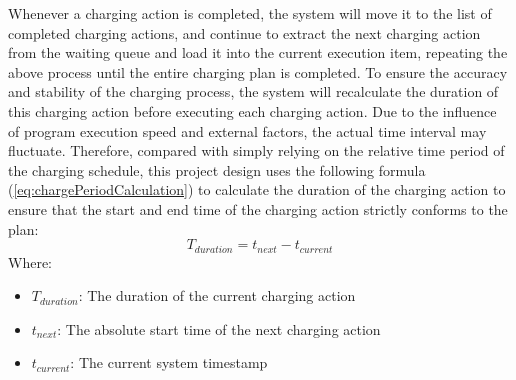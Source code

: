 \documentclass[
english,
ruledheaders=section,%
class=report,%
thesis={type=Report},%
accentcolor=9c,%
custommargins=true,%
marginpar=false,%
parskip=half-,%
fontsize=11pt,%
logofile={img/tuda_logo.pdf}, %
]{tudapub}
\begin{document}
\begin{enumerate}[label=\Alph*.]
        Whenever a charging action is completed, the system will move it to the list of completed charging actions, and continue to extract the next charging action from the waiting queue and load it into the current execution item, repeating the above process until the entire charging plan is completed.
        To ensure the accuracy and stability of the charging process, the system will recalculate the duration of this charging action before executing each charging action. Due to the influence of program execution speed and external factors, the actual time interval may fluctuate. Therefore, compared with simply relying on the relative time period of the charging schedule, this project design uses the following formula (\ref{eq:chargePeriodCalculation}) to calculate the duration of the charging action to ensure that the start and end time of the charging action strictly conforms to the plan:
        \begin{equation}
            \label{eq:chargePeriodCalculation}
            T_{duration} = t_{next} - t_{current}
        \end{equation}
        Where:
        \begin{itemize}
            \item $T_{duration}$: The duration of the current charging action
            \item $t_{next}$: The absolute start time of the next charging action
            \item $t_{current}$: The current system timestamp
        \end{itemize}



\end{enumerate}
\end{document}
